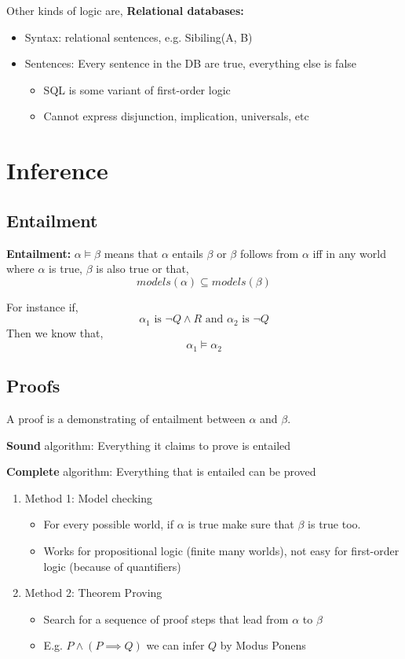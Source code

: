 Other kinds of logic are, 
\textbf{Relational databases:} 
\begin{itemize}
    \item Syntax: relational sentences, e.g. Sibiling(A, B)
    \item Sentences: Every sentence in the DB are true, everything else is false
        \begin{itemize}
            \item SQL is some variant of first-order logic
            \item Cannot express disjunction, implication, universals, etc
        \end{itemize}
\end{itemize}

\section{Inference}
\subsection{Entailment}
\textbf{Entailment: } $\alpha \models \beta$ means that  $\alpha$ entails $\beta$ or $\beta$ follows from $\alpha$ iff in any world where  $\alpha$ is true, $\beta$ is also true or that, 
$$ models(\alpha) \subseteq models(\beta) $$ 

For instance if, 
$$ \alpha_1 \text{ is } \neg Q \wedge R \text{ and } \alpha_2 \text{ is } \neg Q$$ 
Then we know that, 
$$ \alpha_1 \models \alpha_2 $$ 
    
\subsection{Proofs}
A proof is a demonstrating of entailment between $\alpha$ and $\beta$. 

\textbf{Sound}  algorithm: Everything it claims to prove is entailed

\textbf{Complete} algorithm: Everything that is entailed can be proved

\begin{enumerate}
    \item Method 1: Model checking
        \begin{itemize}
            \item For every possible world, if $\alpha$ is true make sure that $\beta$ is true too.
            \item Works for propositional logic (finite many worlds), not easy for first-order logic (because of quantifiers)
        \end{itemize}
    \item Method 2: Theorem Proving
        \begin{itemize}
            \item Search for a sequence of proof steps that lead from $\alpha $ to  $\beta$
            \item E.g.   $P \wedge (P \implies Q)$ we can infer  $Q$  by Modus Ponens
        \end{itemize}
\end{enumerate}

